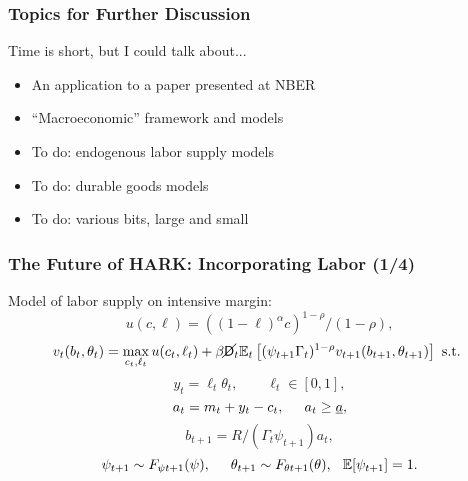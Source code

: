 \documentclass[11ptt]{beamer}
\newcommand{\E}{\mathbb{E}}
\newcommand{\Die}{\mathsf{D}}
\newcommand{\Live}{\cancel{\Die}}
\begin{document}
\begin{frame}\label{DiscussionTopics}
\frametitle{Topics for Further Discussion}

Time is short, but I could talk about...
\begin{itemize}
\item An application to a paper presented at NBER  \hyperlink{Fagereng}{}

\item ``Macroeconomic'' framework and models \hyperlink{Macroeconomics}{}

\item To do: endogenous labor supply models  \hyperlink{LaborSupply}{}

\item To do: durable goods models \hyperlink{DurableGoods}{}

\item To do: various bits, large and small \hyperlink{StructuralChanges}{}
\end{itemize}
\end{frame}


\begin{frame}\label{LaborSupply}
\frametitle{The Future of HARK: Incorporating Labor (1/4)}
Model of labor supply on intensive margin:
\begin{equation*}
u(c,\ell) = ((1-\ell)^\alpha c)^{1-\rho}/(1-\rho),
\end{equation*}
\begin{equation*}
v_t(b_t,\theta_t) = \max_{c_t, \ell_t} u(c_t,\ell_t) + \beta \Live_t \E_t \left[(\psi_{t+1} \Gamma_t)^{1-\rho} v_{t+1}(b_{t+1},\theta_{t+1}) \right] \text{ s.t. }
\end{equation*}
\begin{equation*}
y_t = \ell_t \theta_t, \qquad \ell_t \in [0,1],
\end{equation*}
\begin{equation*}
a_t = m_t + y_t - c_t, \hspace{0.5cm} a_t \geq \underline{a},
\end{equation*}
\begin{equation*}
b_{t+1} = R/(\Gamma_t \psi_{t+1}) a_t, 
\end{equation*}
\begin{equation*}
\psi_{t+1} \sim F_{\psi t+1}(\psi), \hspace{0.5cm} \theta_{t+1} \sim F_{\theta t+1}(\theta), \hspace{0.25cm} \E[\psi_{t+1}] = 1.
\end{equation*}
\end{frame}
\end{document}
